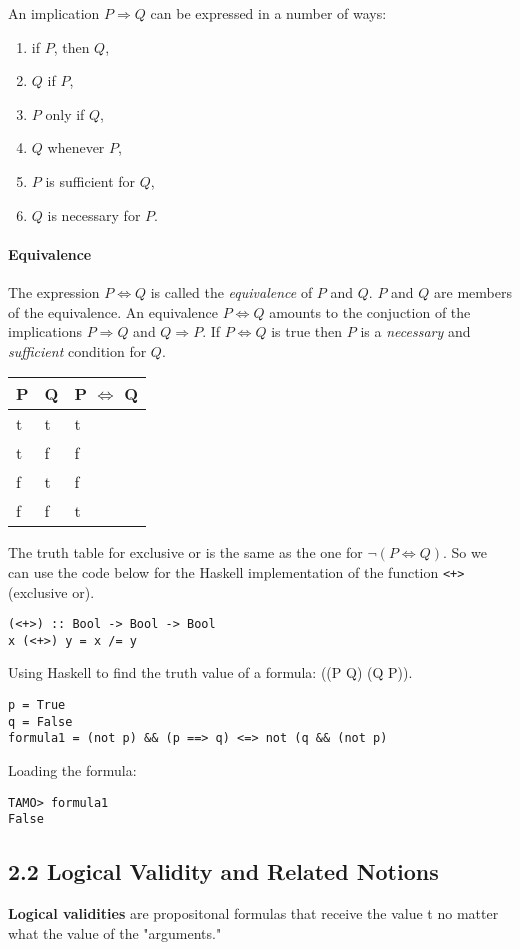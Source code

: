 \documentclass[11pt]{article}
\begin{document}
An implication $P \Rightarrow Q$ can be expressed in a number of ways:
\begin{enumerate}
\item if $P$, then $Q$,
\item $Q$ if $P$,
\item $P$ only if $Q$,
\item $Q$ whenever $P$,
\item $P$ is sufficient for $Q$,
\item $Q$ is necessary for $P$.
\end{enumerate}

\paragraph{Equivalence}
The expression $P \iff Q$ is called the \textit{equivalence} of $P$ and $Q$. $P$ and $Q$ are members of the equivalence. An equivalence $P \iff Q$ amounts to the conjuction of the implications $P \Rightarrow Q$ and $Q \Rightarrow P$. If $P \iff Q$ is true then $P$ is a \textit{necessary} and \textit{sufficient} condition for $Q$.

\begin{tabular}{|l|l|l|}
\hline
	\textbf{P} & \textbf{Q} & \textbf{P} $\iff$ \textbf{Q}\\
\hline
	t & t & t\\
\hline
	t & f & f\\
\hline
	f & t & f\\
\hline
	f & f & t\\
\hline
\end{tabular}

The truth table for exclusive or is the same as the one for $\lnot (P \iff Q)$. So we can use the code below for the Haskell implementation of the function \texttt{<+>} (exclusive or).

\begin{verbatim}
(<+>) :: Bool -> Bool -> Bool
x (<+>) y = x /= y
\end{verbatim}

Using Haskell to find the truth value of a formula: 
$$\lnot \land ((P \Rightarrow Q) \iff \lnot (Q \land \lnot P)).

\begin{verbatim}
p = True
q = False
formula1 = (not p) && (p ==> q) <=> not (q && (not p)
\end{verbatim}

Loading the formula:
\begin{verbatim}
TAMO> formula1
False
\end{verbatim}

\subsection*{2.2 Logical Validity and Related Notions}

\textbf{Logical validities} are propositonal formulas that receive the value t no matter what the value of the "arguments."
\end{document}
